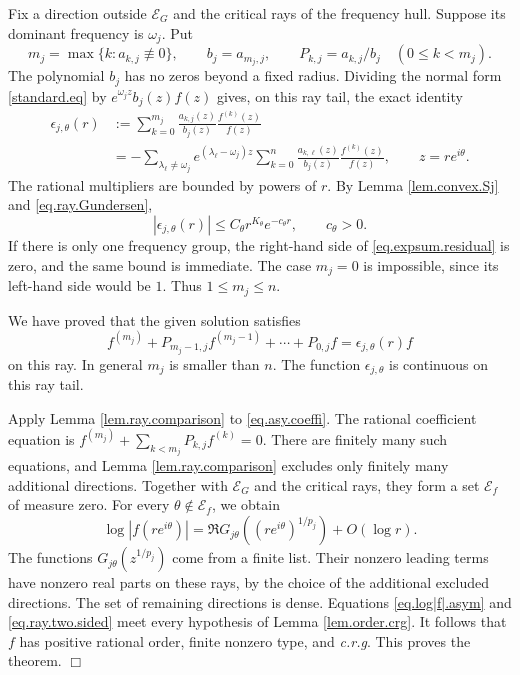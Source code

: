 \documentclass[a4paper,12pt]{article}
\newenvironment{proof}
{\noindent{\it Proof.}}{\hfill $\Box$\par\vspace{2.5mm}}
\numberwithin{equation}{section}
\begin{document}
\begin{proof}
Fix a direction outside $\mathcal E_G$ and the critical rays of the
frequency hull. Suppose its dominant frequency is $\omega_j$.
Put
\[
 m_j=\max\{k:a_{k,j}\not\equiv0\},\qquad
 b_j=a_{m_j,j},\qquad P_{k,j}=a_{k,j}/b_j\quad(0\le k<m_j).
\]
The polynomial $b_j$ has no zeros beyond a fixed radius.
Dividing the normal form \eqref{standard.eq} by
$e^{\omega_jz}b_j(z)f(z)$ gives, on this ray tail, the exact identity
\begin{equation}\label{eq.expsum.residual}
 \begin{split}
 \epsilon_{j,\theta}(r)
 &:=\sum_{k=0}^{m_j}\frac{a_{k,j}(z)}{b_j(z)}
                       \frac{f^{(k)}(z)}{f(z)}\\
 &=-\sum_{\lambda_\ell\ne\omega_j}
       e^{(\lambda_\ell-\omega_j)z}
       \sum_{k=0}^{n}\frac{a_{k,\ell}(z)}{b_j(z)}
                         \frac{f^{(k)}(z)}{f(z)},
 \qquad z=re^{i\theta}.
 \end{split}
\end{equation}
The rational multipliers are bounded by powers of $r$.
By Lemma \ref{lem.convex.Sj} and \eqref{eq.ray.Gundersen},
\begin{equation}\label{eq.expsum.small}
 |\epsilon_{j,\theta}(r)|\le C_\theta r^{K_\theta}e^{-c_\theta r},
 \qquad c_\theta>0.
\end{equation}
If there is only one frequency group, the right-hand side of
\eqref{eq.expsum.residual} is zero, and the same bound is immediate.
The case $m_j=0$ is impossible, since its left-hand side would be $1$.
Thus $1\le m_j\le n$.

We have proved that the given solution satisfies
\begin{equation}\label{eq.asy.coeffi}
 f^{(m_j)}+P_{m_j-1,j}f^{(m_j-1)}+\cdots+P_{0,j}f
 =\epsilon_{j,\theta}(r)f
\end{equation}
on this ray. In general $m_j$ is smaller than $n$.
The function $\epsilon_{j,\theta}$ is continuous on this ray tail.

Apply Lemma \ref{lem.ray.comparison} to \eqref{eq.asy.coeffi}.
The rational coefficient equation is
$f^{(m_j)}+\sum_{k<m_j}P_{k,j}f^{(k)}=0$.
There are finitely many such equations, and Lemma \ref{lem.ray.comparison}
excludes only finitely many additional directions. Together with $\mathcal E_G$ and the
critical rays, they form a set $\mathcal E_f$ of measure zero.
For every $\theta\notin\mathcal E_f$, we obtain
\begin{equation}\label{eq.log|f|.asym}
 \log|f(re^{i\theta})|
 =\Re G_{j\theta}((re^{i\theta})^{1/p_j})+O(\log r).
\end{equation}
The functions $G_{j\theta}(z^{1/p_j})$ come from a finite list.
Their nonzero leading terms have nonzero real parts on these rays,
by the choice of the additional excluded directions.
The set of remaining directions is dense.
Equations \eqref{eq.log|f|.asym} and \eqref{eq.ray.two.sided}
meet every hypothesis of Lemma \ref{lem.order.crg}.
It follows that $f$ has positive rational order, finite nonzero type,
and \textit{c.r.g}. This proves the theorem.
\end{proof}
\end{document}
